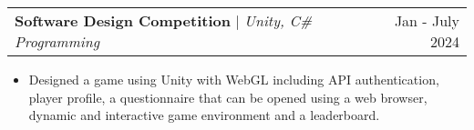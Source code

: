 \documentclass[letterpaper,11pt]{article}
\makeatletter
\newcommand{\resumeItem}[1]{
  \item\small{
    {#1 \vspace{-2pt}}
  }
}
\newcommand{\resumeProjectHeading}[2]{
    \item
    \begin{tabular*}{0.97\textwidth}{l@{\extracolsep{\fill}}r}
      \small#1 & #2 \\
    \end{tabular*}\vspace{-7pt}
}
\newcommand{\resumeItemListStart}{\begin{itemize}}
\newcommand{\resumeItemListEnd}{\end{itemize}\vspace{-5pt}}
\makeatother
\begin{document}

        \resumeProjectHeading
        {\textbf{Software Design Competition }{\href{https://github.com/SasiniWanigathunga/SDC_Tesseract.git}
        {\faIcon{external-link-square-alt}}} $|$ \footnotesize\emph{Unity, C\# Programming}}{Jan - July 2024} 
        \resumeItemListStart
            \vspace{2pt}
            \resumeItem{Designed a game using Unity with WebGL including API authentication, player profile, a questionnaire that can be opened using a web browser, dynamic and interactive game environment and a leaderboard.}
        \resumeItemListEnd

        
        
\end{document}
